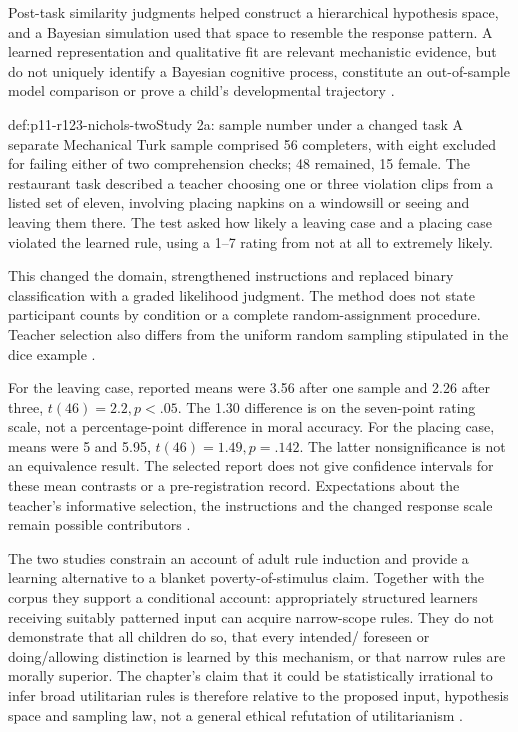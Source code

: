 Post-task similarity judgments helped construct a hierarchical hypothesis
space, and a Bayesian simulation used that space to resemble the response
pattern. A learned representation and qualitative fit are relevant
mechanistic evidence, but do not uniquely identify a Bayesian cognitive
process, constitute an out-of-sample model comparison or prove a child's
developmental trajectory \parencite[pp.~540--542]{NicholsEtAl2016RulesR123}.

\begin{hbdefinition}{def:p11-r123-nichols-two}{Study 2a: sample number under a changed task}
A separate Mechanical Turk sample comprised 56 completers, with eight
excluded for failing either of two comprehension checks; 48 remained,
15 female. The restaurant task described a teacher choosing one or three
violation clips from a listed set of eleven, involving placing napkins
on a windowsill or seeing and leaving them there. The test asked how
likely a leaving case and a placing case violated the learned rule,
using a 1--7 rating from not at all to extremely likely.

This changed the domain, strengthened instructions and replaced binary
classification with a graded likelihood judgment. The method does not
state participant counts by condition or a complete random-assignment
procedure. Teacher selection also differs from the uniform random
sampling stipulated in the dice example
\parencite[pp.~543--544]{NicholsEtAl2016RulesR123}.
\end{hbdefinition}

For the leaving case, reported means were 3.56 after one sample and 2.26
after three, \(t(46)=2.2,p<.05\). The 1.30 difference is on the
seven-point rating scale, not a percentage-point difference in moral
accuracy. For the placing case, means were 5 and 5.95,
\(t(46)=1.49,p=.142\). The latter nonsignificance is not an
equivalence result. The selected report does not give confidence intervals
for these mean contrasts or a pre-registration record. Expectations about
the teacher's informative selection, the instructions and the changed
response scale remain possible contributors
\parencite[p.~544]{NicholsEtAl2016RulesR123}.

The two studies constrain an account of adult rule induction and provide
a learning alternative to a blanket poverty-of-stimulus claim. Together
with the corpus they support a conditional account: appropriately structured
learners receiving suitably patterned input can acquire narrow-scope rules.
They do not demonstrate that all children do so, that every intended/
foreseen or doing/allowing distinction is learned by this mechanism, or
that narrow rules are morally superior. The chapter's claim that it
could be statistically irrational to infer broad utilitarian rules is
therefore relative to the proposed input, hypothesis space and sampling
law, not a general ethical refutation of utilitarianism
\parencite[p.~706]{WiegmannSauer2021MoralJudgment}.

